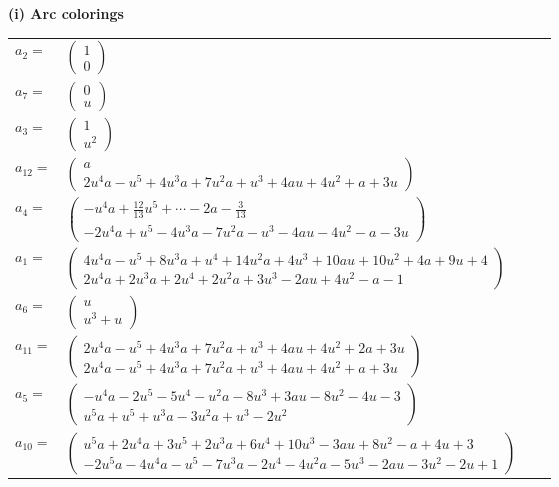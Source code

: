 \documentclass[1p]{elsarticle_modified}
\theoremstyle{definition}
\begin{document}
\flushleft \textbf{(i) Arc colorings}\\
\begin{tabular}{m{7pt} m{180pt} m{7pt} m{180pt} }
\flushright $a_{2}=$&$\begin{pmatrix}1\\0\end{pmatrix}$ \\
\flushright $a_{7}=$&$\begin{pmatrix}0\\u\end{pmatrix}$ \\
\flushright $a_{3}=$&$\begin{pmatrix}1\\u^2\end{pmatrix}$ \\
\flushright $a_{12}=$&$\begin{pmatrix}a\\2 u^4 a- u^5+4 u^3 a+7 u^2 a+u^3+4 a u+4 u^2+a+3 u\end{pmatrix}$ \\
\flushright $a_{4}=$&$\begin{pmatrix}- u^4 a+\frac{12}{13} u^5+\cdots-2 a-\frac{3}{13}\\-2 u^4 a+u^5-4 u^3 a-7 u^2 a- u^3-4 a u-4 u^2- a-3 u\end{pmatrix}$ \\
\flushright $a_{1}=$&$\begin{pmatrix}4 u^4 a- u^5+8 u^3 a+u^4+14 u^2 a+4 u^3+10 a u+10 u^2+4 a+9 u+4\\2 u^4 a+2 u^3 a+2 u^4+2 u^2 a+3 u^3-2 a u+4 u^2- a-1\end{pmatrix}$ \\
\flushright $a_{6}=$&$\begin{pmatrix}u\\u^3+u\end{pmatrix}$ \\
\flushright $a_{11}=$&$\begin{pmatrix}2 u^4 a- u^5+4 u^3 a+7 u^2 a+u^3+4 a u+4 u^2+2 a+3 u\\2 u^4 a- u^5+4 u^3 a+7 u^2 a+u^3+4 a u+4 u^2+a+3 u\end{pmatrix}$ \\
\flushright $a_{5}=$&$\begin{pmatrix}- u^4 a-2 u^5-5 u^4- u^2 a-8 u^3+3 a u-8 u^2-4 u-3\\u^5 a+u^5+u^3 a-3 u^2 a+u^3-2 u^2\end{pmatrix}$ \\
\flushright $a_{10}=$&$\begin{pmatrix}u^5 a+2 u^4 a+3 u^5+2 u^3 a+6 u^4+10 u^3-3 a u+8 u^2- a+4 u+3\\-2 u^5 a-4 u^4 a- u^5-7 u^3 a-2 u^4-4 u^2 a-5 u^3-2 a u-3 u^2-2 u+1\end{pmatrix}$ \\

\end{tabular}
\end{document}
